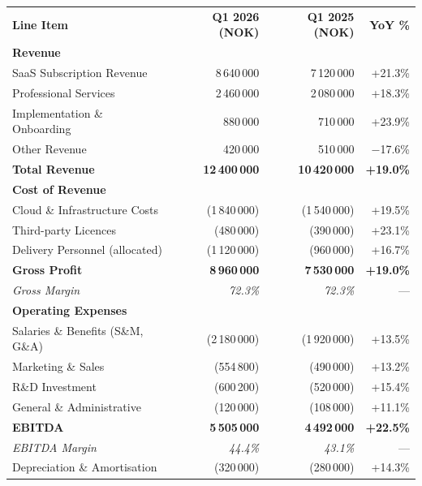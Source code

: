 \documentclass[a4paper,11pt]{article}
\begin{document}
\begin{tabularx}{\textwidth}{Xrrr}
  \rowcolor{brand}
  \color{white}\textbf{Line Item} &
  \color{white}\textbf{Q1 2026 (NOK)} &
  \color{white}\textbf{Q1 2025 (NOK)} &
  \color{white}\textbf{YoY \%} \\
  \rowcolor{lightgray}
  \textbf{Revenue} & & & \\
  SaaS Subscription Revenue & 8\,640\,000 & 7\,120\,000 & +21.3\% \\
  \rowcolor{lightgray}
  Professional Services & 2\,460\,000 & 2\,080\,000 & +18.3\% \\
  Implementation \& Onboarding & 880\,000 & 710\,000 & +23.9\% \\
  \rowcolor{lightgray}
  Other Revenue & 420\,000 & 510\,000 & $-$17.6\% \\
  \midrule
  \textbf{Total Revenue} & \textbf{12\,400\,000} & \textbf{10\,420\,000} & \textbf{+19.0\%} \\
  \midrule
  \rowcolor{lightgray}
  \textbf{Cost of Revenue} & & & \\
  Cloud \& Infrastructure Costs & (1\,840\,000) & (1\,540\,000) & +19.5\% \\
  \rowcolor{lightgray}
  Third-party Licences & (480\,000) & (390\,000) & +23.1\% \\
  Delivery Personnel (allocated) & (1\,120\,000) & (960\,000) & +16.7\% \\
  \midrule
  \rowcolor{lightgray}
  \textbf{Gross Profit} & \textbf{8\,960\,000} & \textbf{7\,530\,000} & \textbf{+19.0\%} \\
  \textit{Gross Margin} & \textit{72.3\%} & \textit{72.3\%} & --- \\
  \midrule
  \rowcolor{lightgray}
  \textbf{Operating Expenses} & & & \\
  Salaries \& Benefits (S\&M, G\&A) & (2\,180\,000) & (1\,920\,000) & +13.5\% \\
  \rowcolor{lightgray}
  Marketing \& Sales & (554\,800) & (490\,000) & +13.2\% \\
  R\&D Investment & (600\,200) & (520\,000) & +15.4\% \\
  \rowcolor{lightgray}
  General \& Administrative & (120\,000) & (108\,000) & +11.1\% \\
  \midrule
  \textbf{EBITDA} & \textbf{5\,505\,000} & \textbf{4\,492\,000} & \textbf{+22.5\%} \\
  \textit{EBITDA Margin} & \textit{44.4\%} & \textit{43.1\%} & --- \\
  \midrule
  \rowcolor{lightgray}
  Depreciation \& Amortisation & (320\,000) & (280\,000) & +14.3\% \\

\end{tabularx}
\end{document}

